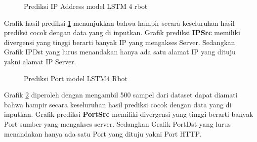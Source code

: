 \documentclass[./skripsi.tex]{subfiles}
\begin{document}
\begin{figure}%
    \centering
    \caption{Prediksi IP Address model LSTM 4 rbot}
    \label{fig:lstm4_rbot_pred1}
\end{figure}

\par Grafik hasil prediksi \ref{fig:lstm4_rbot_pred1} menunjukkan bahwa hampir secara keseluruhan hasil prediksi cocok dengan data yang di inputkan. Grafik prediksi \textbf{IPSrc} memiliki divergensi yang tinggi berarti banyak IP yang mengakses Server. Sedangkan Grafik IPDst yang lurus menandakan hanya ada satu alamat IP yang dituju yakni alamat IP Server.

\begin{figure}%
    \centering
    \caption{Prediksi Port model LSTM4 Rbot}
    \label{fig:lstm4_rbot_pred2}
\end{figure}

\par Grafik \ref{fig:lstm4_rbot_pred2} diperoleh dengan mengambil 500 sampel dari dataset dapat diamati bahwa hampir secara keseluruhan hasil prediksi cocok dengan data yang di inputkan. Grafik prediksi \textbf{PortSrc} memiliki divergensi yang tinggi berarti banyak Port sumber yang mengakses server. Sedangkan Grafik PortDst yang lurus menandakan hanya ada satu Port yang dituju yakni Port HTTP.
\end{document}
